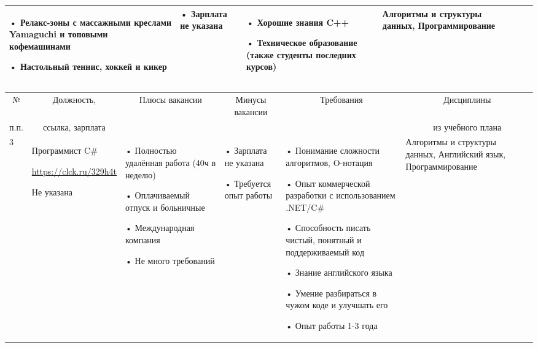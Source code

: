 \documentclass[14pt]{extreport}
\begin{document}
\begin{landscape}
\begin{table}[H]
\begin{center}
\begin{small}
\begin{tabular}{|p{0.1cm}|p{5cm}|p{4.5cm}|p{4.5cm}|p{4cm}|p{3cm}|}
				• Релакс-зоны с массажными креслами Yamaguchi и топовыми кофемашинами
				
				• Настольный теннис, хоккей и кикер 
				&
				• Зарплата не указана
				&
				• Хорошие знания C++
				
				• Техническое образование (также студенты последних курсов)
				&
				Алгоритмы и структуры данных, Программирование
				\\
				\hline
			\end{tabular}
		\end{small}
	\end{center}
\end{table}
\begin{table}[H]
	\begin{center}
		\begin{small}
		\begin{tabular}{|p{0.1cm}|p{5cm}|p{4.5cm}|p{4.5cm}|p{4cm}|p{3cm}|} \hline
			\multicolumn{1}{|c|}{№}&\multicolumn{1}{c|}{Должность,}&\multicolumn{1}{c|}{Плюсы вакансии}&\multicolumn{1}{c|}{Минусы вакансии}&\multicolumn{1}{c|}{Требования}&\multicolumn{1}{c|}{Дисциплины}\\ 
			\multicolumn{1}{|c|}{п.п.}&\multicolumn{1}{c|}{ссылка, зарплата}&\multicolumn{1}{c|}{}&\multicolumn{1}{c|}{}&\multicolumn{1}{c|}{}&\multicolumn{1}{c|}{из учебного плана}\\ 
			\hline				
				3 & Программист C\#
				
				\url{https://clck.ru/329h4t}
				
				Не указана	&
				• Полностью удалённая работа (40ч в неделю)
				
				• Оплачиваемый отпуск и больничные
				
				• Международная компания
				
				• Не много требований 
				&
				• Зарплата не указана
				
				• Требуется опыт работы 
				&
				• Понимание сложности алгоритмов, O-нотация
				
				• Опыт коммерческой разработки с использованием .NET/C\#
				
				• Способность писать чистый, понятный и поддерживаемый код
				
				• Знание английского языка
				
				• Умение разбираться в чужом коде и улучшать его
				
				• Опыт работы 1-3 года 
				&
				Алгоритмы и структуры данных, Английский язык, Программирование
				\\
				\hline
			\end{tabular}
		\end{small}
	\end{center}
\end{table}


\end{landscape}
\end{document}
